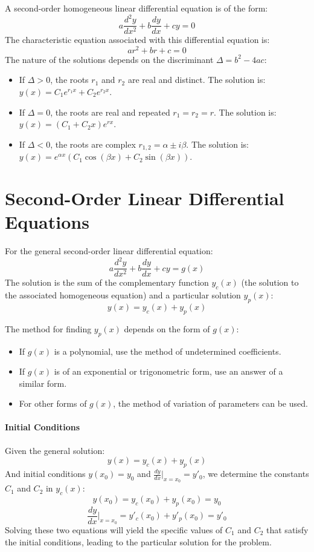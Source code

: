 \documentclass[]{article}
\begin{document}
	A second-order homogeneous linear differential equation is of the form:
	$$
	a\frac{d^2y}{dx^2} + b\frac{dy}{dx} + cy = 0
	$$
	The characteristic equation associated with this differential equation is:
	$$
	ar^2 + br + c = 0
	$$
	The nature of the solutions depends on the discriminant $\Delta = b^2 - 4ac$:
	\begin{itemize}
		\item If $\Delta > 0$, the roots $r_1$ and $r_2$ are real and distinct.
		The solution is: $y(x) = C_1e^{r_1x} + C_2e^{r_2x}$.
		\item If $\Delta = 0$, the roots are real and repeated $r_1 = r_2 = r$.
		The solution is: $y(x) = (C_1 + C_2x)e^{rx}$.
		\item If $\Delta < 0$, the roots are complex $r_{1,2} = \alpha \pm i\beta$.
		The solution is: $y(x) = e^{\alpha x}(C_1\cos(\beta x) + C_2\sin(\beta x))$.
	\end{itemize}
	
	\section{Second-Order Linear Differential Equations}
	
	For the general second-order linear differential equation:
	$$
	a\frac{d^2y}{dx^2} + b\frac{dy}{dx} + cy = g(x)
	$$
	The solution is the sum of the complementary function $y_c(x)$
	(the solution to the associated homogeneous equation)
	and a particular solution $y_p(x)$:
	$$
	y(x) = y_c(x) + y_p(x)
	$$
	
	The method for finding $y_p(x)$ depends on the form of $g(x)$:
	\begin{itemize}
		\item If $g(x)$ is a polynomial, use the method of undetermined coefficients.
		\item If $g(x)$ is of an exponential or trigonometric form, use an answer of a similar form.
		\item For other forms of $g(x)$, the method of variation of parameters can be used.
	\end{itemize}
	
	\paragraph{Initial Conditions}
	
	Given the general solution:
	$$
	y(x) = y_c(x) + y_p(x)
	$$
	And initial conditions $y(x_0) = y_0$ and $\frac{dy}{dx}\Big|_{x=x_0} = y'_0$, we determine the constants $C_1$ and $C_2$ in $y_c(x)$:
	$$
	y(x_0) = y_c(x_0) + y_p(x_0) = y_0
	$$
	$$
	\frac{dy}{dx}\Big|_{x=x_0} = y'_c(x_0) + y'_p(x_0) = y'_0
	$$
	Solving these two equations will yield the specific values of $C_1$ and $C_2$ that satisfy the initial conditions, leading to the particular solution for the problem.
	
	
\end{document}
